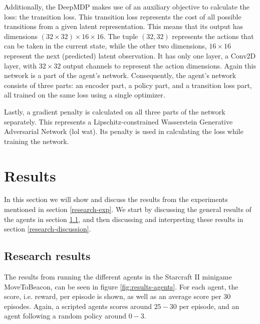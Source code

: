 Additionally, the DeepMDP makes use of an auxiliary objective to calculate the loss: the transition loss. This transition loss represents the cost of all possible transitions from a given latent representation. This means that its output has dimensions $(32 \times 32) \times 16 \times 16$. The tuple $(32, 32)$ represents the actions that can be taken in the current state, while the other two dimensions, $16 \times 16$ represent the next (predicted) latent observation. It has only one layer, a Conv2D layer, with $32 \times 32$ output channels to represent the action dimensions. Again this network is a part of the agent's network. Consequently, the agent's network consists of three parts: an encoder part, a policy part, and a transition loss part, all trained on the same loss using a single optimizer.

Lastly, a gradient penalty is calculated on all three parts of the network separately. This represents a Lipschitz-constrained Wasserstein Generative Adversarial Network (lol wat). Its penalty is used in calculating the loss while training the network. 


\section{Results}\label{research-results}
In this section we will show and discuss the results from the experiments mentioned in section \ref{research-exp}. We start by discussing the general results of the agents in section \ref{research-general-results}, and then discussing and interpreting these results in section \ref{research-discussion}.

\subsection{Research results}\label{research-general-results}
The results from running the different agents in the Starcraft II minigame MoveToBeacon, can be seen in figure \ref{fig:results-agents}. For each agent, the score, i.e. reward, per episode is shown, as well as an average score per $30$ episodes. Again, a scripted agents scores around $25-30$ per episode, and an agent following a random policy around $0-3$.


